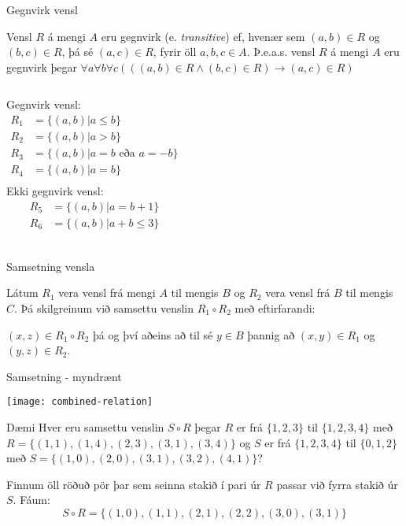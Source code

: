 \documentclass[handout]{beamer}
\begin{document}
\begin{frame}[fragile]{Gegnvirk vensl}
\begin{tcolorbox}[title=Gegnvirk vensl]
Vensl $R$ á mengi $A$ eru gegnvirk (e. \emph{transitive}) ef, hvenær sem $(a, b) \in R$ og $(b, c) \in R$, þá sé $(a, c) \in R$, fyrir öll $a, b, c \in A$. Þ.e.a.s. vensl $R$ á mengi $A$ eru gegnvirk þegar $\forall a\forall b\forall c(((a, b) \in R \land (b, c) \in R) \to (a, c) \in R)$
\end{tcolorbox}
\begin{columns}
Gegnvirk vensl:
\begin{align*}
R_1 &= \{(a, b)|a \leq b\}\\
R_2 &= \{(a, b)|a > b\}\\
R_3 &= \{(a, b)|a = b \text{ eða } a = -b\}\\
R_4 &= \{(a, b)|a = b\}\\
\end{align*}
Ekki gegnvirk vensl:
\begin{align*}
R_5 &= \{(a, b)|a = b+1\}\\
R_6 &= \{(a, b)|a+b \leq 3\}\\
\end{align*}
\end{columns}
\end{frame}

\begin{frame}{Samsetning vensla}
\begin{tcolorbox}[title=Samsetning vensla]
Látum $R_1$ vera vensl frá mengi $A$ til mengis $B$ og $R_2$ vera vensl frá $B$ til mengis $C$. Þá skilgreinum við samsettu venslin $R_1 \circ R_2$ með eftirfarandi:

$(x,z) \in R_1 \circ R_2$ þá og því aðeins að til sé $y \in B$ þannig að $(x,y) \in R_1$ og $(y,z) \in R_2$.
\end{tcolorbox}
\end{frame}

\begin{frame}{Samsetning - myndrænt}
\begin{center}
\texttt{[image: combined-relation]}
\end{center}
\end{frame}

\begin{frame}{Dæmi}
Hver eru samsettu venslin $S \circ R$ þegar $R$ er frá $\{1, 2, 3\}$ til $\{1, 2, 3, 4\}$ með $R = \{(1, 1), (1, 4), (2, 3), (3, 1), (3, 4)\}$ og $S$ er frá $\{1, 2, 3, 4\}$ til $\{0, 1, 2\}$ með $S = \{(1, 0), (2, 0), (3, 1), (3, 2), (4, 1)\}$? \pause 

\vspace{0.5cm}
Finnum öll röðuð pör þar sem seinna stakið í pari úr $R$ passar við fyrra stakið úr $S$. Fáum:
\[
 S \circ R = \{(1, 0), (1, 1), (2, 1), (2, 2), (3, 0), (3, 1)\}
\]
\end{frame}
\end{document}
